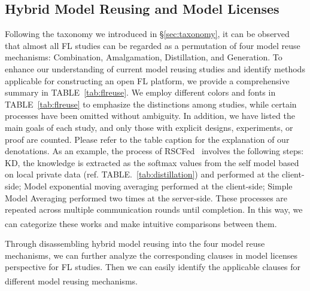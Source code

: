 
\subsection{Hybrid Model Reusing and Model Licenses}
\label{sec:hybrid}
Following the taxonomy we introduced in \S\ref{sec:taxonomy}, it can be observed that almost all FL studies can be regarded as a permutation of four model reuse mechanisms: Combination, Amalgamation, Distillation, and Generation.
To enhance our understanding of current model reusing studies and identify methods applicable for constructing an open FL platform, we provide a comprehensive summary in TABLE~\ref{tab:flreuse}.
We employ different colors and fonts in TABLE~\ref{tab:flreuse} to emphasize the distinctions among studies, while certain processes have been omitted without ambiguity.
In addition, we have listed the main goals of each study, and only those with explicit designs, experiments, or proof are counted.
Please refer to the table caption for the explanation of our denotations.
As an example, the process of RSCFed~\cite{liang2022rscfed} involves the following steps: 
 KD, the knowledge is extracted as the softmax values from the self model based on local private data (ref. TABLE.~\ref{tab:distillation}) and performed at the client-side;
 Model exponential moving averaging performed at the client-side;
 Simple Model Averaging performed two times at the server-side.
These processes are repeated across multiple communication rounds until completion.
In this way, we can categorize these works and make intuitive comparisons between them\textsuperscript{}.

Through disassembling hybrid model reusing into the four model reuse mechanisms, we can further analyze the corresponding clauses in model licenses perspective for FL studies.
Then we can easily identify the applicable clauses for different model reusing mechanisms\textsuperscript{}.


